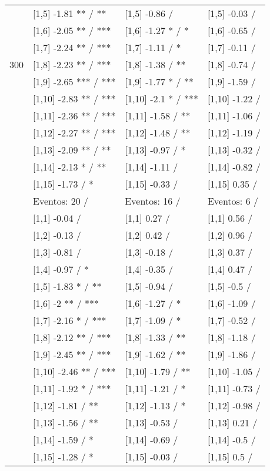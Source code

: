 \begin{table}
\begin{tabular}[t]{llll}
 & {}[1,5] -1.81 ** / ** & {}[1,5] -0.86  / & {}[1,5] -0.03  /\\
 & {}[1,6] -2.05 ** / *** & {}[1,6] -1.27 * / * & {}[1,6] -0.65  /\\
 & {}[1,7] -2.24 ** / *** & {}[1,7] -1.11  / * & {}[1,7] -0.11  /\\
300 & {}[1,8] -2.23 ** / *** & {}[1,8] -1.38  / ** & {}[1,8] -0.74  /\\
\addlinespace
 & {}[1,9] -2.65 *** / *** & {}[1,9] -1.77 * / ** & {}[1,9] -1.59  /\\
 & {}[1,10] -2.83 ** / *** & {}[1,10] -2.1 * / *** & {}[1,10] -1.22  /\\
 & {}[1,11] -2.36 ** / *** & {}[1,11] -1.58  / ** & {}[1,11] -1.06  /\\
 & {}[1,12] -2.27 ** / *** & {}[1,12] -1.48  / ** & {}[1,12] -1.19  /\\
 & {}[1,13] -2.09 ** / ** & {}[1,13] -0.97  / * & {}[1,13] -0.32  /\\
\addlinespace
 & {}[1,14] -2.13 * / ** & {}[1,14] -1.11  / & {}[1,14] -0.82  /\\
 & {}[1,15] -1.73  / * & {}[1,15] -0.33  / & {}[1,15] 0.35  /\\
 & Eventos:  20 / & Eventos:  16 / & Eventos:  6 /\\
 & {}[1,1] -0.04  / & {}[1,1] 0.27  / & {}[1,1] 0.56  /\\
 & {}[1,2] -0.13  / & {}[1,2] 0.42  / & {}[1,2] 0.96  /\\
\addlinespace
 & {}[1,3] -0.81  / & {}[1,3] -0.18  / & {}[1,3] 0.37  /\\
 & {}[1,4] -0.97  / * & {}[1,4] -0.35  / & {}[1,4] 0.47  /\\
 & {}[1,5] -1.83 * / ** & {}[1,5] -0.94  / & {}[1,5] -0.5  /\\
 & {}[1,6] -2 ** / *** & {}[1,6] -1.27  / * & {}[1,6] -1.09  /\\
 & {}[1,7] -2.16 * / *** & {}[1,7] -1.09  / * & {}[1,7] -0.52  /\\
\addlinespace
500 & {}[1,8] -2.12 ** / *** & {}[1,8] -1.33  / ** & {}[1,8] -1.18  /\\
 & {}[1,9] -2.45 ** / *** & {}[1,9] -1.62  / ** & {}[1,9] -1.86  /\\
 & {}[1,10] -2.46 ** / *** & {}[1,10] -1.79  / ** & {}[1,10] -1.05  /\\
 & {}[1,11] -1.92 * / *** & {}[1,11] -1.21  / * & {}[1,11] -0.73  /\\
 & {}[1,12] -1.81  / ** & {}[1,12] -1.13  / * & {}[1,12] -0.98  /\\
\addlinespace
 & {}[1,13] -1.56  / ** & {}[1,13] -0.53  / & {}[1,13] 0.21  /\\
 & {}[1,14] -1.59  / * & {}[1,14] -0.69  / & {}[1,14] -0.5  /\\
 & {}[1,15] -1.28  / * & {}[1,15] -0.03  / & {}[1,15] 0.5  /\\
\bottomrule
\end{tabular}
\end{table}
